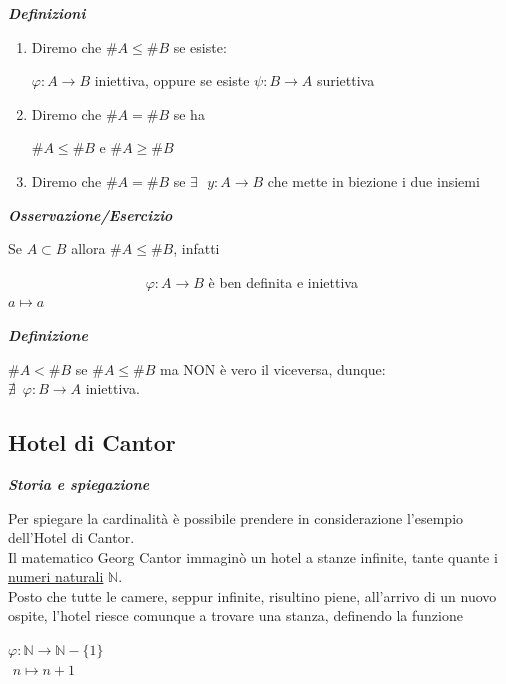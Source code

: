 \documentclass{article}
\theoremstyle{definition}
\begin{document}
\begin{center}
    \textbf{\textit{Definizioni}}
\end{center}
\begin{enumerate}
    \item Diremo che $\#A \leqslant \#B$ se esiste:
    \begin{center}
        $\varphi: A \to B$ iniettiva, oppure se esiste $\psi : B \to A$ suriettiva
    \end{center}

    \item Diremo che $\#A=\#B$ se ha 
        \begin{center}
            $\#A \leqslant \#B$ e $\#A \geqslant \#B$
        \end{center}
    \item Diremo che $\#A=\#B$ se $\exists \,\,\,\, y: A \to B$ che mette in biezione i due insiemi
    \end{enumerate}

    \begin{center}
        \textbf{\textit{Osservazione/Esercizio}}
    \end{center}
Se $A \subset B$ allora $\#A \leqslant \#B$, infatti
\begin{center}
   \,\,\,\,\,\,\,\,\,\,\,\,\,\,\,\,\,\,\,\,\,\,\,\,\,\,\,\,\,\,\,\,\,\,\,\,\,\,\,\,\,\,\,\,\,\,\,\,\,\,\,\,\,\,\,\,\, $\varphi: A \to B$ è ben definita e iniettiva
    \\ $a \mapsto a$
\end{center}

\begin{center}
    \textbf{\textit{Definizione}}
\end{center}
$\#A < \#B$ se $\#A \leqslant \#B$ ma NON è vero il viceversa, dunque:
\\ $\nexists \,\,\, \varphi : B \rightarrow A$ iniettiva.
\newpage
\subsection{Hotel di Cantor}
\begin{center}
    \textbf{\textit{Storia e spiegazione}}
\end{center}
Per spiegare la cardinalità è possibile prendere in considerazione l'esempio dell'Hotel di Cantor.
\\Il matematico Georg Cantor immaginò un hotel a stanze infinite, tante quante i \underline{numeri naturali} $\mathbb{N}$.
\\
Posto che tutte le camere, seppur infinite, risultino piene, all'arrivo di un nuovo ospite, l'hotel riesce comunque a trovare una stanza, definendo la funzione 
\begin{center}
   $ \varphi: \mathbb{N}\to \mathbb{N}-\{1\}$
    \\$ \,\, n \mapsto n+1$
\end{center}
\end{document}
